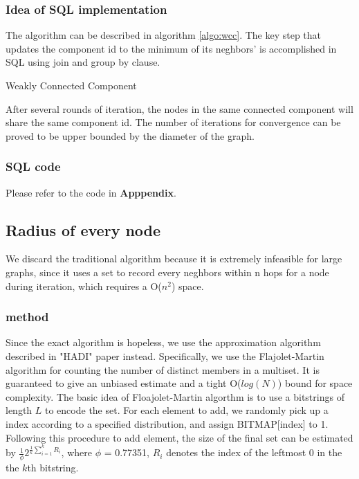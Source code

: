 \subsubsection{Idea of SQL implementation}
The algorithm can be described in algorithm \ref{algo:wcc}. The key step that updates the 
component id to the minimum of its neghbors' is accomplished in SQL using join and group by
clause.
\begin{algorithm}
\caption{Weakly Connected Component}
\begin{algorithmic}
\REPEAT
{}
\end{algorithmic}
\label{algo:wcc}
\end{algorithm}
After several rounds of iteration, the nodes in the same connected component will share the same component id.
The number of iterations for convergence can be proved to be upper bounded by the diameter of the graph.

\subsubsection{SQL code}
Please refer to the code in {\bf Apppendix}.

\subsection{Radius of every node}
We discard the traditional algorithm because it is extremely infeasible for large graphs, since it uses a set to record every neghbors within n hops for a node during iteration, which requires a O($n^2$) space.
\subsubsection{method}
Since the exact algorithm is hopeless, we use the approximation algorithm described in "HADI" paper\cite{DBLP:journals/tkdd/KangTAFL11} instead. Specifically, we use the Flajolet-Martin algorithm for counting the number of distinct members in a multiset. It is guaranteed to give an unbiased estimate and a tight O($log(N)$) bound for space complexity. The basic idea of Floajolet-Martin algorthm is to use a bitstrings of length $L$ to encode the set. For each element to add, we randomly pick up a index according to a specified distribution, and assign BITMAP[index] to 1. Following this procedure to add element, the size of the final set can be estimated by $\frac{1}{\phi} 2^{\frac{1}{k}\sum_{i=1}^k R_i}$, where $\phi$ = 0.77351, $R_i$ denotes the index of the leftmost 0 in the the $k$th bitstring.

